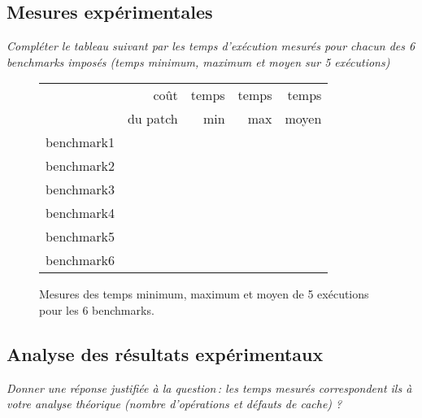 \documentclass[a4paper, 10pt, french]{article}
\begin{document}
\subsection{Mesures expérimentales}
{\em Compléter le tableau suivant par les temps d'exécution mesurés pour chacun des 6 benchmarks imposés
  (temps minimum, maximum et moyen sur 5 exécutions)
}

\begin{figure}[h]
  \begin{center}
    \begin{tabular}{|l||r||r|r|r||}
      \hline
      \hline
                 & coût     & temps & temps & temps \\
                 & du patch & min   & max   & moyen \\
      \hline
      \hline
      benchmark1 &          &       &       &       \\
      \hline
      benchmark2 &          &       &       &       \\
      \hline
      benchmark3 &          &       &       &       \\
      \hline
      benchmark4 &          &       &       &       \\
      \hline
      benchmark5 &          &       &       &       \\
      \hline
      benchmark6 &          &       &       &       \\
      \hline
      \hline
    \end{tabular}
    \caption{Mesures des temps minimum, maximum et moyen de 5 exécutions pour les 6 benchmarks.}
    \label{table-temps}
  \end{center}
\end{figure}

\subsection{Analyse des résultats expérimentaux}
{\em Donner  une réponse justifiée  à la question\,:
  les  temps mesurés correspondent ils  à votre analyse théorique (nombre d’opérations et défauts de cache) ?
}
\end{document}
